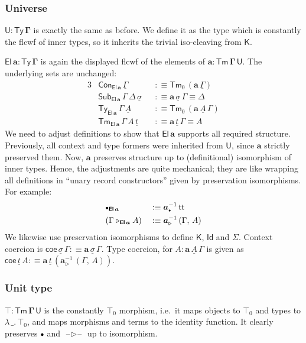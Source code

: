 \documentclass[12pt,a4paper,twoside,openany]{book}
\theoremstyle{remark}
\theoremstyle{definition}
\theoremstyle{theorem}
\newcommand{\bs}[1]{\boldsymbol{#1}}
\newcommand{\Con}{\mathsf{Con}}
\newcommand{\Sub}{\mathsf{Sub}}
\newcommand{\Tm}{\mathsf{Tm}}
\newcommand{\Ty}{\mathsf{Ty}}
\newcommand{\U}{\mathsf{U}}
\newcommand{\El}{\mathsf{El}}
\newcommand{\Id}{\mathsf{Id}}
\renewcommand{\tt}{\mathsf{tt}}
\newcommand{\blank}{\mathord{\hspace{1pt}\text{--}\hspace{1pt}}}
\newcommand{\ext}{\triangleright}
\newcommand{\emptycon}{\scaleobj{.75}\bullet}
\newcommand{\K}{\mathsf{K}}
\newcommand{\bTy}{\bs{\Ty}}
\newcommand{\bGamma}{\bs{\Gamma}}
\newcommand{\ba}{\bs{a}}
\newcommand{\bU}{\bs{\U}}
\newcommand{\bEl}{\bs{\El}}
\newcommand{\bK}{\bs{\mathsf{K}}}
\newcommand{\ul}[1]{\underline{#1}}
\newcommand{\ulGamma}{\ul{\Gamma}}
\newcommand{\ulsigma}{\ul{\sigma}}
\newcommand{\ult}{\ul{t}}
\newcommand{\ulA}{\ul{A}}
\newcommand{\coe}{\mathsf{coe}}
\newcommand{\defn}{:\equiv}
\begin{document}
\subsubsection{Universe}

$\bU : \bTy\,\bGamma$ is exactly the same as before. We define it as the type
which is constantly the flcwf of inner types, so it inherits the trivial
iso-cleaving from $\bK$.

$\bs{\El\,a : \Ty\,\Gamma}$ is again the displayed flcwf of
the elements of $\bs{a : \Tm\,\Gamma\,\U}$. The underlying sets are unchanged:
\begingroup
\allowdisplaybreaks
\begin{alignat*}{3}
  & \Con_{\bEl\,\ba}\,\ulGamma && \defn \Tm_0\,(\ba\,\ulGamma)\\
  & \Sub_{\bEl\,\ba}\,\Gamma\,\Delta\,\ulsigma && \defn \ba\,\ulsigma\,\Gamma \equiv \Delta\\
  & \Ty_{\bEl\,\ba}\,\Gamma\,\ulA && \defn \Tm_0\,(\ba\,\ulA\,\Gamma)\\
  & \Tm_{\bEl\,\ba}\,\Gamma\,A\,\ult && \defn \ba\,\ult\,\Gamma \equiv A
\end{alignat*}
\endgroup
We need to adjust definitions to show that $\bs{\El\,a}$ supports all required
structure. Previously, all context and type formers were inherited from $\bU$,
since $\ba$ strictly preserved them. Now, $\ba$ preserves structure up to
(definitional) isomorphism of inner types. Hence, the adjustments are quite
mechanical; they are like wrapping all definitions in ``unary record constructors''
given by preservation isomorphisms. For example:
\begin{alignat*}{3}
  & \emptycon_{\bEl\,\ba} && \defn \ba_{\emptycon}^{-1}\,\tt\\
  & (\Gamma\ext_{\bEl\,\ba} A) && \defn \ba_{\ext}^{-1}\,(\Gamma,\,A)
\end{alignat*}
We likewise use preservation isomorphisms to define $\K$, $\Id$ and $\Sigma$.
Context coercion is $\coe\,\ulsigma\,\Gamma \defn \ba\,\ulsigma\,\Gamma$. Type
coercion, for $A : \ba\,\ulA\,\Gamma$ is given as $\coe\,\ult\,A \defn
\ba\,\ult\,(\ba_{\ext}^{-1}\,(\Gamma,\,A))$.

\subsubsection{Unit type}

$\bs{\top : \Tm\,\Gamma\,\U}$ is the constantly $\top_0$ morphism, i.e.\ it maps
objects to $\top_0$ and types to $\lambda\,\_.\,\top_0$, and maps morphisms and
terms to the identity function. It clearly preserves $\emptycon$ and $\blank\!\ext\!\blank$
up to isomorphism.
\end{document}
